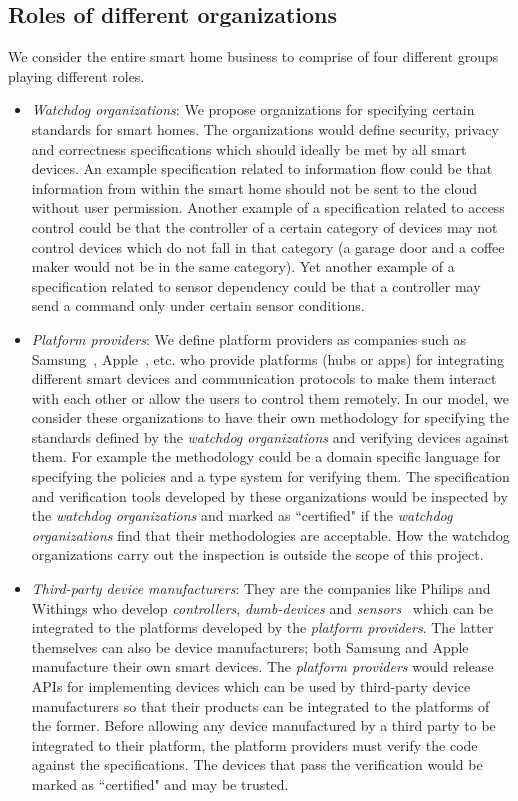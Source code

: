 \documentclass{article}
\begin{document}
\subsection{Roles of different organizations}
\label{subsec:roles}
We consider the entire smart home business to comprise of four different groups playing different roles. 
\begin{itemize}[topsep=0pt,itemsep=0ex,partopsep=1ex,parsep=1ex]
\item \textit{Watchdog organizations}: We propose organizations \cite{eff} for specifying certain standards for smart homes. The organizations would define security, privacy and correctness specifications which should ideally be met by all smart devices. An example specification related to information flow could be that information from within the smart home should not be sent to the cloud without user permission. Another example of a specification related to access control could be that the controller of a certain category of devices may not control devices which do not fall in that category (a garage door and a coffee maker would not be in the same category). Yet another example of a specification related to sensor dependency could be that a controller may send a command only under certain sensor conditions.

\item \textit{Platform providers}: We define platform providers as companies such as Samsung~\cite{samsung}, Apple~\cite{homekit}, etc. who provide platforms (hubs or apps) for integrating different smart devices and communication protocols to make them interact with each other or allow the users to control them remotely. In our model, we consider these organizations to have their own methodology for specifying the standards defined by the \textit{watchdog organizations} and verifying devices against them. For example the methodology could be a domain specific language for specifying the policies and a type system for verifying them. 
The specification and verification tools developed by these organizations would be inspected by the \textit{watchdog organizations} and marked as ``certified" if the \textit{watchdog organizations} find that their methodologies are acceptable. How the watchdog organizations carry out the inspection is outside the scope of this project. 


\item \textit{Third-party device manufacturers}: They are the companies like Philips and Withings who develop \textit{controllers}, \textit{dumb-devices} and \textit{sensors}~\cite{workswithsmartthings, workswithhomekit} which can be integrated to the platforms developed by the \textit{platform providers}. The latter themselves can also be device manufacturers; both Samsung and Apple manufacture their own smart devices. 
The \textit{platform providers} would release APIs for implementing devices which can be used by third-party device manufacturers so that their products can be integrated to the platforms of the former.
Before  allowing any device manufactured by a third party to be integrated to their platform, the platform providers must verify the code against the specifications. The devices that pass the verification would be marked as ``certified" and may be trusted. 


\end{itemize}
\end{document}
